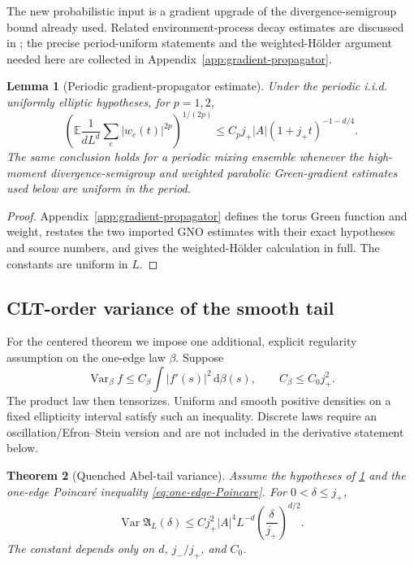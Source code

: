 \documentclass[11pt]{article}
\newtheorem{theorem}{Theorem}[section]
\newtheorem{lemma}[theorem]{Lemma}
\theoremstyle{definition}
\theoremstyle{remark}
\newcommand{\E}{\mathbb E}
\newcommand{\Var}{\operatorname{Var}}
\newcommand{\abs}[1]{\left\lvert #1\right\rvert}
\newcommand{\dd}{\,\mathrm d}
\begin{document}
The new probabilistic input is a gradient upgrade of the divergence-semigroup
bound already used.  Related environment-process decay estimates are discussed in
\cite{deBuyerMourrat2015}; the precise period-uniform statements and the
weighted-Hölder argument needed here are collected in
Appendix~\ref{app:gradient-propagator}.

\begin{lemma}[Periodic gradient-propagator estimate]
\label{lem:periodic-gradient-propagator}
Under the periodic i.i.d. uniformly elliptic hypotheses, for $p=1,2$,
\begin{equation}
 \left(
 \E\frac{1}{dL^d}\sum_e\abs{w_e(t)}^{2p}
 \right)^{1/(2p)}
 \le C_pj_+\abs A(1+j_+t)^{-1-d/4}.
 \label{eq:periodic-gradient-propagator}
\end{equation}
The same conclusion holds for a periodic mixing ensemble whenever the
high-moment divergence-semigroup and weighted parabolic Green-gradient
estimates used below are uniform in the period.
\end{lemma}

\begin{proof}
Appendix~\ref{app:gradient-propagator} defines the torus Green function and weight, restates the two imported GNO estimates with their exact hypotheses and source numbers, and gives the weighted-H\"older calculation in full.  The constants are uniform in $L$.
\end{proof}

\subsection{CLT-order variance of the smooth tail}

For the centered theorem we impose one additional, explicit regularity
assumption on the one-edge law $\beta$.  Suppose
\begin{equation}
 \Var_\beta f
 \le C_\beta\int\abs{f'(s)}^2\dd\beta(s),
 \qquad C_\beta\le C_0j_+^2.
 \label{eq:one-edge-Poincare}
\end{equation}
The product law then tensorizes.  Uniform and smooth positive densities on a
fixed ellipticity interval satisfy such an inequality.  Discrete laws require
an oscillation/Efron--Stein version and are not included in the derivative
statement below.

\begin{theorem}[Quenched Abel-tail variance]
\label{thm:quenched-Abel-variance}
Assume the hypotheses of \cref{lem:periodic-gradient-propagator} and the
one-edge Poincar\'e inequality \eqref{eq:one-edge-Poincare}.  For
$0<\delta\le j_+$,
\begin{equation}
 \boxed{
 \Var\mathfrak A_L(\delta)
 \le Cj_+^2\abs A^4L^{-d}
 \left(\frac{\delta}{j_+}\right)^{d/2}.}
 \label{eq:quenched-Abel-variance}
\end{equation}
The constant depends only on $d$, $j_-/j_+$, and $C_0$.
\end{theorem}
\end{document}
